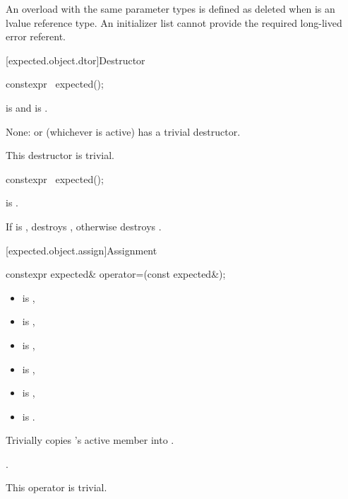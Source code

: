 \begin{itemdescr}
\pnum
\remarks
An overload with the same parameter types is defined as deleted when  is an lvalue reference type. An initializer list cannot provide the required long-lived error referent.
\end{itemdescr}

[expected.object.dtor]{Destructor}

%
\begin{itemdecl}
constexpr ~expected();
\end{itemdecl}

\begin{itemdescr}
\pnum
\constraints
{} is  and  is .

\pnum
\effects
None:  or  (whichever is active) has a trivial destructor.

\pnum
\remarks
This destructor is trivial.
\end{itemdescr}

%
\begin{itemdecl}
constexpr ~expected();
\end{itemdecl}

\begin{itemdescr}
\pnum
\constraints
{} is .

\pnum
\effects
If  is , destroys , otherwise destroys .
\end{itemdescr}

[expected.object.assign]{Assignment}

%
\begin{itemdecl}
constexpr expected& operator=(const expected&);
\end{itemdecl}

\begin{itemdescr}
\pnum
\constraints
\begin{itemize}
\item {} is ,
\item {} is ,
\item {} is ,
\item {} is ,
\item {} is ,
\item {} is .
\end{itemize}

\pnum
\effects
Trivially copies 's active member into .

\pnum
\returns
{}.

\pnum
\remarks
This operator is trivial.
\end{itemdescr}

